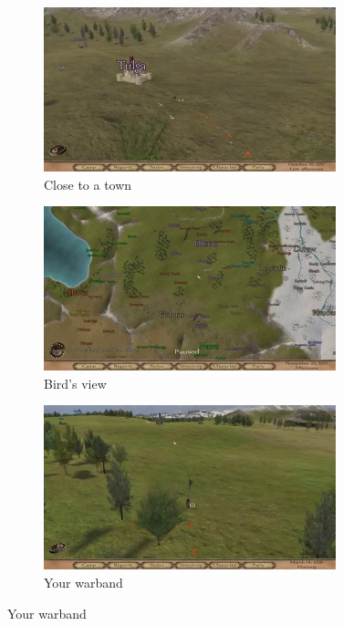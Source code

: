 \documentclass[
]{article}
\begin{document}
\begin{figure}
	\centering
	\begin{subfigure}[b]{0.3\textwidth}
		\includegraphics[width=\linewidth]{docimages/E_0041_00_09_28.jpg}
		\caption{Close to a town}
	\end{subfigure}
	\begin{subfigure}[b]{0.3\textwidth}
		\includegraphics[width=\linewidth]{docimages/E_0049_00_15_38.jpg}
		\caption{Bird's view}
	\end{subfigure}
	\begin{subfigure}[b]{0.3\textwidth}
		\includegraphics[width=\linewidth]{docimages/E_0063_00_17_06.jpg}
		\caption{Your warband}
	\end{subfigure}
\end{figure}
\end{document}
